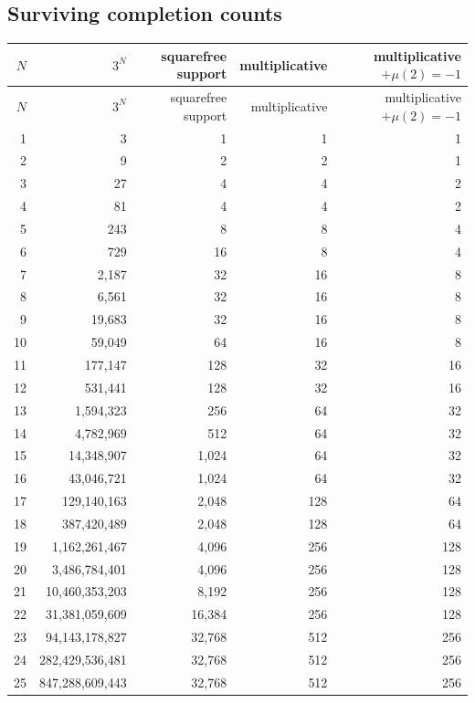 \documentclass[11pt]{article}
\begin{document}
\subsection{Surviving completion counts}
\begin{center}\scriptsize\begin{longtable}{r r r r r}
\toprule $N$ & $3^N$ & squarefree support & multiplicative & multiplicative $+\mu(2)=-1$\\ \midrule\endfirsthead
\toprule $N$ & $3^N$ & squarefree support & multiplicative & multiplicative $+\mu(2)=-1$\\ \midrule\endhead
1 & 3 & 1 & 1 & 1\\
2 & 9 & 2 & 2 & 1\\
3 & 27 & 4 & 4 & 2\\
4 & 81 & 4 & 4 & 2\\
5 & 243 & 8 & 8 & 4\\
6 & 729 & 16 & 8 & 4\\
7 & 2{,}187 & 32 & 16 & 8\\
8 & 6{,}561 & 32 & 16 & 8\\
9 & 19{,}683 & 32 & 16 & 8\\
10 & 59{,}049 & 64 & 16 & 8\\
11 & 177{,}147 & 128 & 32 & 16\\
12 & 531{,}441 & 128 & 32 & 16\\
13 & 1{,}594{,}323 & 256 & 64 & 32\\
14 & 4{,}782{,}969 & 512 & 64 & 32\\
15 & 14{,}348{,}907 & 1{,}024 & 64 & 32\\
16 & 43{,}046{,}721 & 1{,}024 & 64 & 32\\
17 & 129{,}140{,}163 & 2{,}048 & 128 & 64\\
18 & 387{,}420{,}489 & 2{,}048 & 128 & 64\\
19 & 1{,}162{,}261{,}467 & 4{,}096 & 256 & 128\\
20 & 3{,}486{,}784{,}401 & 4{,}096 & 256 & 128\\
21 & 10{,}460{,}353{,}203 & 8{,}192 & 256 & 128\\
22 & 31{,}381{,}059{,}609 & 16{,}384 & 256 & 128\\
23 & 94{,}143{,}178{,}827 & 32{,}768 & 512 & 256\\
24 & 282{,}429{,}536{,}481 & 32{,}768 & 512 & 256\\
25 & 847{,}288{,}609{,}443 & 32{,}768 & 512 & 256\\
\bottomrule\end{longtable}\end{center}
\end{document}
